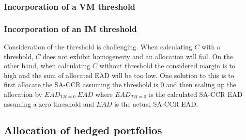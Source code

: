 \documentclass[../Thesis_AHoecherl.tex]{subfiles}
\begin{document}
    \subsubsection{Incorporation of a VM threshold\label{sec:Incorporation of a VM threshold}}
    
    \subsubsection{Incorporation of an IM threshold\label{sec:Incorporation of an IM threshold}}
    
    Consideration of the threshold is challenging. When calculating $C$ with a threshold, $C$ does not exhibit homogeneity and an allocation will fail. On the other hand, when calculating $C$ without threshold the considered margin is to high and the sum of allocated EAD will be too low.
    One solution to this is to first allocate the SA-CCR assuming the threshold is 0 and then scaling up the allocation by $EAD_{TH = 0} \ EAD$ where $EAD_{TH = 0}$ is the calculated SA-CCR EAD assuming a zero threshold and $EAD$ is the actual SA-CCR EAD.
    
    
    \subsection{Allocation of hedged portfolios\label{sec:Allocation of hedged portfolios}}
    
\end{document}
